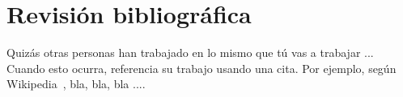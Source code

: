 \chapter{Revisión bibliográfica}
\label{revision}

Quizás otras personas han trabajado en lo mismo que tú vas a trabajar
... Cuando esto ocurra, referencia su trabajo usando una cita. Por
ejemplo, según Wikipedia~\cite{Wikipedia}, bla, bla, bla ....

